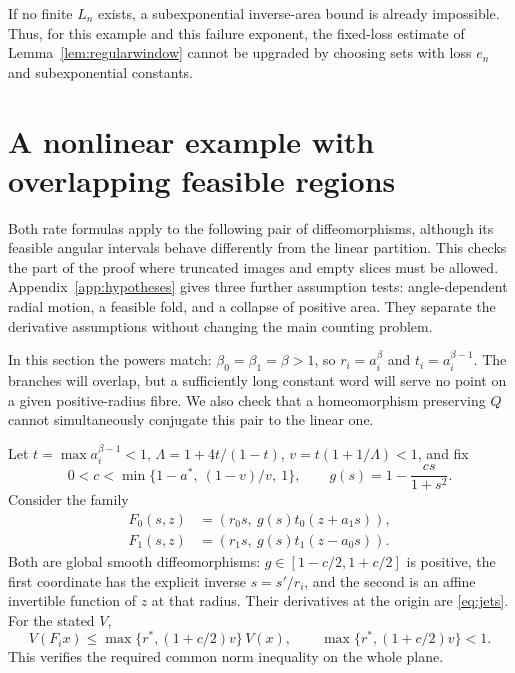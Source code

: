 \documentclass[11pt]{amsart}
\theoremstyle{definition}
\theoremstyle{remark}
\numberwithin{equation}{section}
\begin{document}
If no finite $L_n$ exists, a subexponential inverse-area bound is
already impossible. Thus, for this example and this failure exponent,
the fixed-loss estimate of Lemma~\ref{lem:regularwindow} cannot
be upgraded by choosing sets with loss $e_n$ and subexponential
constants.

\section{A nonlinear example with overlapping feasible regions}\label{sec:examples}
Both rate formulas apply to the following pair of diffeomorphisms,
although its feasible angular intervals behave differently from
the linear partition. This checks the part of the proof where
truncated images and empty slices must be allowed.
Appendix~\ref{app:hypotheses} gives three further assumption tests:
angle-dependent radial motion, a feasible fold, and a collapse of
positive area. They separate the derivative assumptions without
changing the main counting problem.

\label{sec:inward}
In this section the powers match: $\beta_0=\beta_1=\beta>1$,
so $r_i=a_i^\beta$ and $t_i=a_i^{\beta-1}$.
The branches will overlap, but a sufficiently long constant word
will serve no point on a given positive-radius fibre. We also
check that a homeomorphism preserving $Q$ cannot simultaneously
conjugate this pair to the linear one.

Let \(t=\max a_i^{\beta-1}<1\),
\(\Lambda=1+4t/(1-t)\), \(v=t(1+1/\Lambda)<1\), and fix
\[
       0<c<\min\{1-a^*,\ (1-v)/v,\ 1\},\qquad
       g(s)=1-\frac{cs}{1+s^2}.
\]
Consider the family
\begin{equation}
\begin{split}
 F_0(s,z)&=(r_0s,\ g(s)t_0(z+a_1s)),\\
 F_1(s,z)&=(r_1s,\ g(s)t_1(z-a_0s)).                         \label{eq:inward}
\end{split}
\end{equation}
Both are global smooth diffeomorphisms: \(g\in[1-c/2,1+c/2]\)
is positive, the first coordinate has the explicit inverse
\(s=s'/r_i\), and the second is an affine invertible function of
\(z\) at that radius. Their derivatives at the origin are \eqref{eq:jets}.
For the stated \(V\),
\begin{equation}
V(F_i x)\le\max\{r^*,(1+c/2)v\}\,V(x),
 \qquad \max\{r^*,(1+c/2)v\}<1.                            \label{eq:inwardnorm}
\end{equation}
This verifies the required common norm inequality on the whole
plane.
\end{document}
